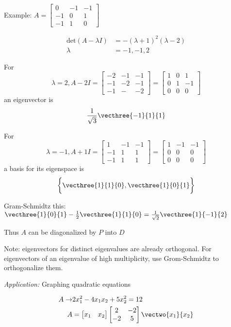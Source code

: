 \documentclass[12pt]{article}
\begin{document}

Example: $A = \begin{bmatrix}0&-1&-1\\-1&0&1\\-1&1&0\end{bmatrix}$

\begin{align*}
\text{det}(A-\lambda I) &= -(\lambda+1)^2(\lambda-2)\\
\lambda &= -1,-1,2
\end{align*}

For \[ \lambda = 2, A-2I = \begin{bmatrix}-2&-1&-1\\-1&-2&-1\\-1&-&-2\end{bmatrix} = \begin{bmatrix}1&0&1\\0&1&-1\\0&0&0\end{bmatrix} \] an eigenvector is \[ \frac{1}{\sqrt{3}}\vecthree{-1}{1}{1} \]

For \[ \lambda = -1, A+1I = \begin{bmatrix}1&-1&-1\\-1&1&1\\-1&1&1\end{bmatrix} = \begin{bmatrix}1&-1&-1\\0&0&0\\0&0&0\end{bmatrix} \] a basis for its eigenspace is \[ \bigg\{\vecthree{1}{1}{0},\vecthree{1}{0}{1}\bigg\} \]

Gram-Schmidtz this: $\vecthree{1}{0}{1} - \half \vecthree{1}{1}{0} = \frac{1}{\sqrt{2}}\vecthree{1}{-1}{2}$

Thus $A$ can be diagonalized by $P$ into $D$

Note: eigenvectors for distinct eigenvalues are already orthogonal. For eigenvectors of an eigenvalue of high multiplicity, use Grom-Schmidtz to orthogonalize them.

\textit{Application:} Graphing quadratic equations

\begin{align*}
A \to& 2x_1^2 - 4x_1x_2 + 5x_2^2 = 12\\
A &= \begin{bmatrix}x_1&x_2\end{bmatrix}\begin{bmatrix}2&-2\\-2&5\end{bmatrix}\vectwo{x_1}{x_2}\\
\end{align*}
\end{document}
